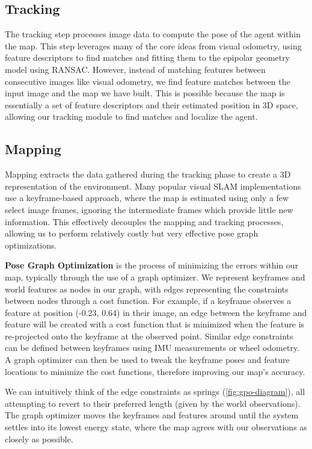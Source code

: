 \subsection{Tracking}
\label{sec:visual-slam-tracking}
The tracking step processes image data to compute the pose of the agent within the map. This step leverages many of the core ideas from visual odometry, using feature descriptors to find matches and fitting them to the epipolar geometry model using RANSAC. However, instead of matching features between consecutive images like visual odometry, we find feature matches between the input image and the map we have built. This is possible because the map is essentially a set of feature descriptors and their estimated position in 3D space, allowing our tracking module to find matches and localize the agent.

\subsection{Mapping}
\label{sec:visual-slam-mapping}
Mapping extracts the data gathered during the tracking phase to create a 3D representation of the environment. Many popular visual SLAM implementations use a keyframe-based approach, where the map is estimated using only a few select image frames, ignoring the intermediate frames which provide little new information. This effectively decouples the mapping and tracking processes, allowing us to perform relatively costly but very effective pose graph optimizations.

\textbf{Pose Graph Optimization} is the process of minimizing the errors within our map, typically through the use of a graph optimizer. We represent keyframes and world features as nodes in our graph, with edges representing the constraints between nodes through a cost function. For example, if a keyframe observes a feature at position (-0.23, 0.64) in their image, an edge between the keyframe and feature will be created with a cost function that is minimized when the feature is re-projected onto the keyframe at the observed point. Similar edge constraints can be defined between keyframes using IMU measurements or wheel odometry. A graph optimizer can then be used to tweak the keyframe poses and feature locations to minimize the cost functions, therefore improving our map's accuracy.

We can intuitively think of the edge constraints as springs (\autoref{fig:gpo-diagram}), all attempting to revert to their preferred length (given by the world observations). The graph optimizer moves the keyframes and features around until the system settles into its lowest energy state, where the map agrees with our observations as closely as possible.



